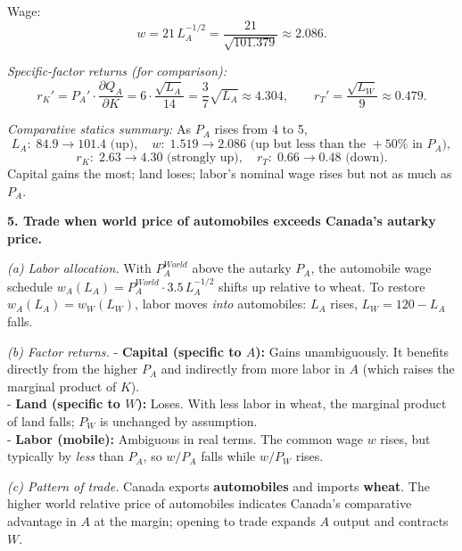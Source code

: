 \documentclass[12pt]{article}
\begin{document}
Wage:
\[
w=21\,L_A^{-1/2}=\frac{21}{\sqrt{101.379}}\approx \boxed{2.086}.
\]

\emph{Specific-factor returns (for comparison):}
\[
r_K'=P_A'\cdot \frac{\partial Q_A}{\partial K}
=6\cdot \frac{\sqrt{L_A}}{14}
=\frac{3}{7}\sqrt{L_A}\approx \boxed{4.304},\qquad
r_T'=\frac{\sqrt{L_W}}{9}\approx \boxed{0.479}.
\]

\medskip
\emph{Comparative statics summary:} As $P_A$ rises from 4 to 5,
\[
L_A:\;84.9\rightarrow 101.4 \text{ (up)},\quad
w:\;1.519\rightarrow 2.086 \text{ (up but less than the }+50\%\text{ in }P_A),
\]
\[
r_K:\;2.63\rightarrow 4.30 \text{ (strongly up)},\quad
r_T:\;0.66\rightarrow 0.48 \text{ (down)}.
\]
Capital gains the most; land loses; labor’s nominal wage rises but not as much as $P_A$.

\bigskip

\noindent \textbf{5. Trade when world price of automobiles exceeds Canada’s autarky price.}

\emph{(a) Labor allocation.} With $P_A^{World}$ above the autarky $P_A$, the automobile wage schedule $w_A(L_A)=P_A^{World}\cdot 3.5\,L_A^{-1/2}$ shifts up relative to wheat. To restore $w_A(L_A)=w_W(L_W)$, labor moves \emph{into} automobiles: $L_A$ rises, $L_W=120-L_A$ falls.

\emph{(b) Factor returns.} 
- \textbf{Capital (specific to $A$):} Gains unambiguously. It benefits directly from the higher $P_A$ and indirectly from more labor in $A$ (which raises the marginal product of $K$). \\
- \textbf{Land (specific to $W$):} Loses. With less labor in wheat, the marginal product of land falls; $P_W$ is unchanged by assumption. \\
- \textbf{Labor (mobile):} Ambiguous in real terms. The common wage $w$ rises, but typically by \emph{less} than $P_A$, so $w/P_A$ falls while $w/P_W$ rises.

\emph{(c) Pattern of trade.} Canada exports \textbf{automobiles} and imports \textbf{wheat}. The higher world relative price of automobiles indicates Canada’s comparative advantage in $A$ at the margin; opening to trade expands $A$ output and contracts $W$.
\end{document}
